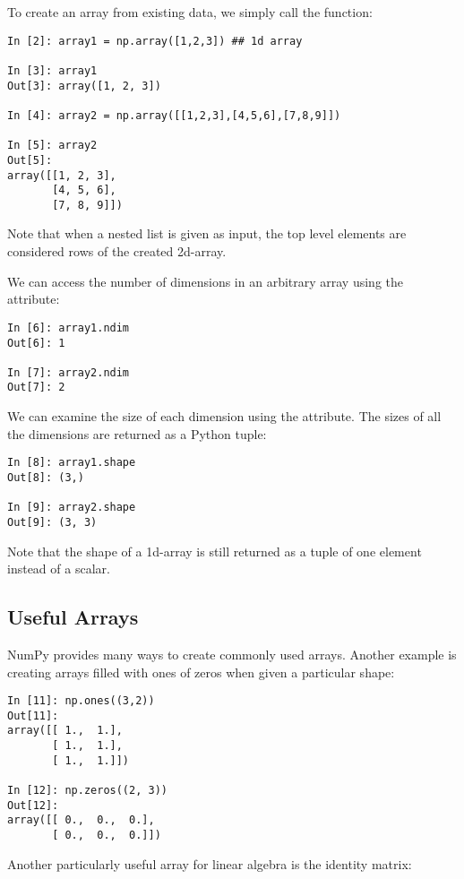 To create an array from existing data, we simply call the  function:

\begin{verbatim}
In [2]: array1 = np.array([1,2,3]) ## 1d array

In [3]: array1
Out[3]: array([1, 2, 3])

In [4]: array2 = np.array([[1,2,3],[4,5,6],[7,8,9]])

In [5]: array2
Out[5]:
array([[1, 2, 3],
       [4, 5, 6],
       [7, 8, 9]])
\end{verbatim}

Note that when a nested list is given as input, the top level elements are considered rows of the created 2d-array.

We can access the number of dimensions in an arbitrary array using the  attribute:
\begin{verbatim}
In [6]: array1.ndim
Out[6]: 1

In [7]: array2.ndim
Out[7]: 2
\end{verbatim}

We can examine the size of each dimension using the  attribute. The sizes of all the dimensions are returned as a Python tuple:

\begin{verbatim}
In [8]: array1.shape
Out[8]: (3,)

In [9]: array2.shape
Out[9]: (3, 3)
\end{verbatim}

Note that the shape of a 1d-array is still returned as a tuple of one element instead of a scalar.

\subsection{Useful Arrays}

NumPy provides many ways to create commonly used arrays. Another example is creating arrays filled with ones of zeros when given a particular shape:

\begin{verbatim}
In [11]: np.ones((3,2))
Out[11]:
array([[ 1.,  1.],
       [ 1.,  1.],
       [ 1.,  1.]])

In [12]: np.zeros((2, 3))
Out[12]:
array([[ 0.,  0.,  0.],
       [ 0.,  0.,  0.]])
\end{verbatim}

Another particularly useful array for linear algebra is the identity matrix:

